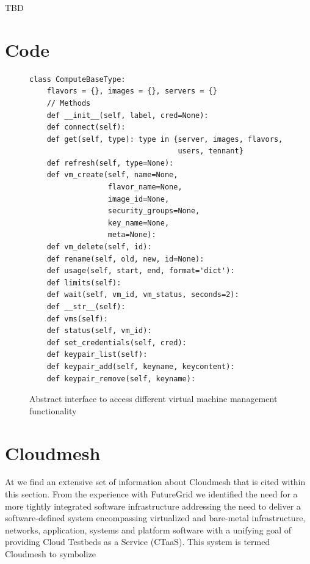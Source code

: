 \documentclass{tex/sig-alternate-2013}
\begin{document}
TBD


\section{Code}

\begin{figure}[htb]
\begin{small}
\begin{verbatim}
class ComputeBaseType:
    flavors = {}, images = {}, servers = {}
    // Methods
    def __init__(self, label, cred=None):
    def connect(self):
    def get(self, type): type in {server, images, flavors, 
                                  users, tennant}
    def refresh(self, type=None):
    def vm_create(self, name=None,
                  flavor_name=None,
                  image_id=None,
                  security_groups=None,
                  key_name=None,
                  meta=None):
    def vm_delete(self, id):
    def rename(self, old, new, id=None):
    def usage(self, start, end, format='dict'):
    def limits(self):
    def wait(self, vm_id, vm_status, seconds=2):
    def __str__(self):
    def vms(self):
    def status(self, vm_id):
    def set_credentials(self, cred):
    def keypair_list(self):
    def keypair_add(self, keyname, keycontent):
    def keypair_remove(self, keyname):
\end{verbatim}
\end{small}
\vspace{-12pt}
\caption{Abstract interface to access different virtual machine
  management functionality}
\end{figure}

\section{Cloudmesh}\label{S:cloudmesh}


At \cite{github-cloudmesh} we find an extensive set of information about Cloudmesh that is cited within this section. 
From the experience with FutureGrid we identified the need for a more tightly integrated software infrastructure addressing the need to deliver a software-defined system encompassing virtualized and bare-metal infrastructure, networks, application, systems and platform software with a unifying goal of providing Cloud Testbeds as a Service (CTaaS). This system is termed Cloudmesh to symbolize 
\end{document}
